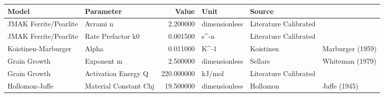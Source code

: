 \begin{tabular}{llrll}
\toprule
Model & Parameter & Value & Unit & Source \\
\midrule
JMAK Ferrite/Pearlite & Avrami n & 2.200000 & dimensionless & Literature Calibrated \\
JMAK Ferrite/Pearlite & Rate Prefactor k0 & 0.001500 & s^-n & Literature Calibrated \\
Koistinen-Marburger & Alpha & 0.011000 & K^-1 & Koistinen & Marburger (1959) \\
Grain Growth & Exponent m & 2.500000 & dimensionless & Sellars & Whiteman (1979) \\
Grain Growth & Activation Energy Q & 220.000000 & kJ/mol & Literature Calibrated \\
Hollomon-Jaffe & Material Constant Chj & 19.500000 & dimensionless & Hollomon & Jaffe (1945) \\
\bottomrule
\end{tabular}
